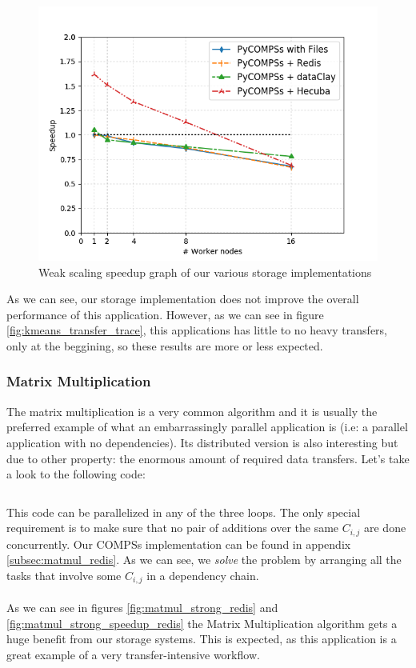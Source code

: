 \begin{figure}[ht!]
\centering
\includegraphics[scale = 0.5]{figures/storage/kmeans_weak_speedup.png}
\caption{Weak scaling speedup graph of our various storage implementations}
\label{fig:kmeans_weak_speedup_redis}
\end{figure}

As we can see, our storage implementation does not improve the overall performance of this application. However, as we can see in figure \ref{fig:kmeans_transfer_trace}, this applications has little to no heavy transfers, only at the beggining, so these results are more or less expected.



\subsubsection{Matrix Multiplication}
\label{subsubsec:matmul_redis}
The matrix multiplication is a very common algorithm and it is usually the preferred example of what an embarrassingly parallel application is (i.e: a parallel application with no dependencies). Its distributed version is also interesting but due to other property: the enormous amount of required data transfers. Let's take a look to the following code:

\inputminted{python}{snippets/matmul_python.py}

This code can be parallelized in any of the three loops. The only special requirement is to make sure that no pair of additions over the same $C_{i, j}$ are done concurrently. Our COMPSs implementation can be found in appendix \ref{subsec:matmul_redis}. As we can see, we \textit{solve} the problem by arranging all the tasks that involve some $C_{i, j}$ in a dependency chain.\\
\\
As we can see in figures \ref{fig:matmul_strong_redis} and \ref{fig:matmul_strong_speedup_redis} the Matrix Multiplication algorithm gets a huge benefit from our storage systems. This is expected, as this application is a great example of a very transfer-intensive workflow.

